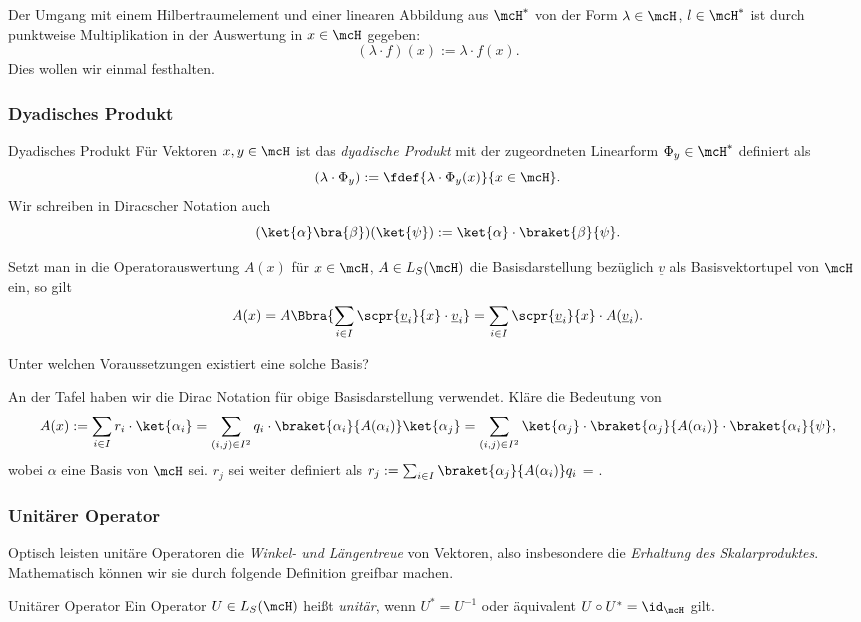 \documentclass{subfiles}
\begin{document}
    Der Umgang mit einem Hilbertraumelement und einer linearen Abbildung aus $\mcH^*$ von der Form $\lambda\in\mcH$, $l\in\mcH^*$ ist durch punktweise Multiplikation in der Auswertung in $x\in\mcH$ gegeben:
    \[(\lambda\cdot f)(x) := \lambda\cdot f(x).\]
    Dies wollen wir einmal festhalten.
    \subsubsection*{Dyadisches Produkt}
        \begin{mdef}{Dyadisches Produkt}
            Für Vektoren $x,y\in\mcH$ ist das \textit{dyadische Produkt} mit der zugeordneten Linearform $\Phi_y\in\mcH^*$ definiert als
            \[(\lambda\cdot \Phi_y):=\fdef{\lambda\cdot \Phi_y(x)}{x\in\mcH}.\]
            Wir schreiben in Diracscher Notation auch
            \[(\ket{\alpha}\bra{\beta})(\ket{\psi}) := \ket{\alpha}\cdot\braket{\beta}{\psi}.\]
        \end{mdef} 
        Setzt man in die Operatorauswertung $A(x)$ für $x\in\mcH$, $A\in L_S(\mcH)$ die Basisdarstellung bezüglich $\underline v$ als Basisvektortupel von $\mcH$ ein, so gilt
        \[A(x) = A\Bbra{\sum_{i\in I}\scpr{\underline v_i}{x}\cdot\underline v_i} = \sum_{i\in I}\scpr{\underline v_i}{x}\cdot A(\underline v_i).\]
        \begin{Aufgabe}
            \nr{} Unter welchen Voraussetzungen existiert eine solche Basis?

            \nr{} An der Tafel haben wir die Dirac Notation für obige Basisdarstellung verwendet. Kläre die Bedeutung von 
            \[A(x) := \sum_{i\in I} r_i\cdot\ket{\alpha_i} = \sum_{(i,j)\in I^2}q_i\cdot\braket{\alpha_i}{A(\alpha_i)}\ket{\alpha_j} = \sum_{(i,j)\in I^2}\ket{\alpha_j}\cdot\braket{\alpha_j}{A(\alpha_i)}\cdot\braket{\alpha_i}{\psi},\]
            wobei $\alpha$ eine Basis von $\mcH$ sei. $r_j$ sei weiter definiert als $r_j:=\sum_{i\in I}\braket{\alpha_j}{A(\alpha_i)}q_i$ = . 
        \end{Aufgabe}

    \subsubsection*{Unitärer Operator}
        Optisch leisten unitäre Operatoren die \emph{Winkel- und Längentreue} von Vektoren, also insbesondere die \emph{Erhaltung des Skalarproduktes}. Mathematisch können wir sie durch folgende Definition greifbar machen. 
        \begin{mdef}{Unitärer Operator}
            Ein Operator $U\in L_S(\mcH)$ heißt \textit{unitär}, wenn $U^* = U^{-1}$ oder äquivalent $U\circ U^* = \id_\mcH$ gilt.
        \end{mdef}

        



        
\end{document}
